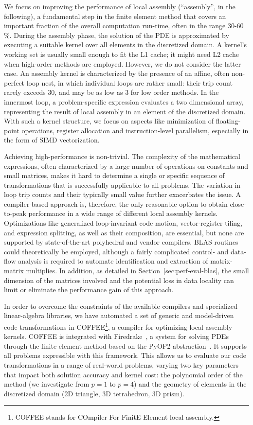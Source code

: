 \documentclass[conference]{IEEEtran}
\begin{document}
We focus on improving the performance of local assembly (``assembly'', in the following), a fundamental step in the finite element method that covers an important fraction of the overall computation run-time, often in the range 30-60$\%$. During the assembly phase, the solution of the PDE is approximated by executing a suitable kernel over all elements in the discretized domain. A kernel's working set is usually small enough to fit the L1 cache; it might need L2 cache when high-order methods are employed. However, we do not consider the latter case. An assembly kernel is characterized by the presence of an affine, often non-perfect loop nest, in which individual loops are rather small: their trip count rarely exceeds 30, and may be as low as 3 for low order methods. In the innermost loop, a problem-specific expression evaluates a two dimensional array, representing the result of local assembly in an element of the discretized domain. With such a kernel structure, we focus on aspects like minimization of floating-point operations, register allocation and instruction-level parallelism, especially in the form of SIMD vectorization.

Achieving high-performance is non-trivial. The complexity of the mathematical expressions, often characterized by a large number of operations on constants and small matrices, makes it hard to determine a single or specific sequence of transformations that is successfully applicable to all problems. The variation in loop trip counts and their typically small value further exacerbates the issue. A compiler-based approach is, therefore, the only reasonable option to obtain close-to-peak performance in a wide range of different local assembly kernels. Optimizations like generalized loop-invariant code motion, vector-register tiling, and expression splitting, as well as their composition, are essential, but none are supported by state-of-the-art polyhedral and vendor compilers. BLAS routines could theoretically be employed, although a fairly complicated control- and data-flow analysis is required to automate identification and extraction of matrix-matrix multiplies. In addition, as detailed in Section~\ref{sec:perf-eval-blas}, the small dimension of the  matrices involved and the potential loss in data locality can limit or eliminate the performance gain of this approach.

In order to overcome the constraints of the available compilers and specialized linear-algebra libraries, we have automated a set of generic and model-driven code transformations in COFFEE\footnote{COFFEE stands for COmpiler For FinitE Element local assembly.}, a compiler for optimizing local assembly kernels. COFFEE is integrated with Firedrake~\cite{firedrake-code}, a system for solving PDEs through the finite element method based on the PyOP2 abstraction~\cite{pyop2isc}. It supports all problems expressible with this framework. This allows us to evaluate our code transformations in a range of real-world problems, varying two key parameters that impact both solution accuracy and kernel cost: the polynomial order of the method (we investigate from $p=1$ to $p=4$) and the geometry of elements in the discretized domain (2D triangle, 3D tetrahedron, 3D prism).
\end{document}
